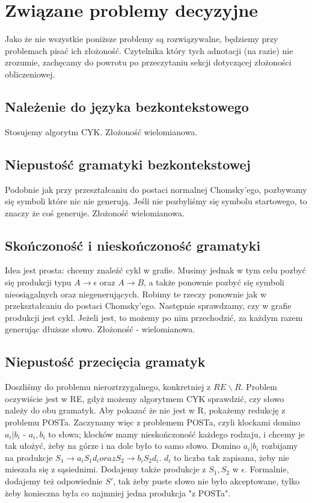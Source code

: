 \section{Związane problemy decyzyjne}

Jako że nie wszystkie poniższe problemy są rozwiązywalne, będziemy przy problemach pisać ich złożoność. Czytelnika który tych adnotacji (na razie) nie zrozumie, zachęcamy do powrotu po przeczytaniu sekcji dotyczącej złożoności obliczeniowej.

\subsection{Należenie do języka bezkontekstowego} 

Stosujemy algorytm CYK. Złożoność wielomianowa.

\subsection{Niepustość gramatyki bezkontekstowej}

Podobnie jak przy przeształcaniu do postaci normalnej Chomsky'ego, pozbywamy się symboli które nic nie generują. Jeśli nie pozbyliśmy się symbolu startowego, to znaczy że coś generuje. Złożoność wielomianowa.

\subsection{Skończoność i nieskończoność gramatyki}

Idea jest prosta: chcemy znaleźć cykl w grafie. Musimy jednak w tym celu pozbyć się produkcji typu \( A \rightarrow \epsilon \) oraz \( A \rightarrow B \), a także ponownie pozbyć się symboli nieosiągalnych oraz niegenerujących. Robimy te rzeczy ponownie jak w przekształcaniu do postaci Chomsky'ego. Następnie sprawdzamy, czy w grafie produkcji jest cykl. Jeżeli jest, to możemy po nim przechodzić, za każdym razem generując dłuższe słowo. Złożoność - wielomianowa.

\subsection{Niepustość przecięcia gramatyk}

Doszliśmy do problemu nieroztrzygalnego, konkretniej z \( RE \backslash R \). Problem oczywiście jest w RE, gdyż możemy algorytmem CYK sprawdzić, czy słowo należy do obu gramatyk. Aby pokazać że nie jest w R, pokażemy redukcję z problemu POSTa. Zaczynamy więc z problemem POSTa, czyli klockami domino \(a_i | b_i \) - \( a_i, b_i \) to słowa; klocków mamy nieskończoność każdego rodzaju, i chcemy je tak ułożyć, żeby na górze i na dole było to samo słowo.  Domino \(a_i | b_i \) rozbijamy na produkcje \( S_1 \rightarrow a_{i}S_{1}d_{i} oraz S_2 \rightarrow b_{i}S_{2}d_{i}\). \( d_i \) to liczba tak zapisana, żeby nie mieszała się z sąsiednimi. Dodajemy także produkcje z \( S_1, S_2 \) w \( \epsilon \). Formalnie, dodajemy też odpowiednie \( S' \), tak żeby puste słowo nie było akceptowane, tylko żeby konieczna była co najmniej jedna produkcja "z POSTa".


